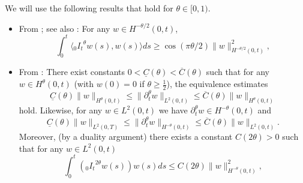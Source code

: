 We will use the following results that hold for $\theta\in[0,1)$.
\begin{itemize}	
	\item
	From \cite[Lemma 2.3]{Eggermont:1987}; see also \cite[Theorem 1]{VoegeliNedaiaslSauter:2016}: For any $w\in H^{-\theta/2}(0,t)$,
	\begin{equation}\label{eqn:coercivityI}
	\int_0^t \langle {_0I_t}^{\theta} w(s),  w(s) \rangle ds \geq \cos ( \pi\theta/2 ) \| w \|_{H^{-\theta/2}(0,t)}^2, 
	\end{equation}	 
	\item 
	From \cite[Theorems 2.1, 2.2, 2.4 and Proposition 2.1]{KubicaRyszewskaYamamoto:2020}:
	There exist constants $0<\underline{C}(\theta)<\overline{C}(\theta)$ such that for any $w\in H^\theta(0,t)$ (with $w(0)=0$ if $\theta\geq\frac12$), the equivalence estimates 
	\begin{equation}\label{eqn:equivalence_pos}
\underline{C}(\theta) \|w\|_{H^\theta(0,t)} \leq \|\partial_t^\theta w\|_{L^2(0,t)}\leq
\overline{C}(\theta) \|w\|_{H^\theta(0,t)}
	\end{equation}
hold.
Likewise, for any $w\in L^2(0,t)$ we have $\partial_t^\theta w\in H^{-\theta}(0,t)$ and 
	\begin{equation}\label{eqn:equivalence_neg}
\underline{C}(\theta) \|w\|_{L^2(0,T)} \leq \|\partial_t^\theta w\|_{H^{-\theta}(0,t)}\leq
\overline{C}(\theta) \|w\|_{L^2(0,t)}.
	\end{equation}
Moreover, (by a duality argument) there exists a constant $C(2\theta)>0$ such that for any $w\in L^2(0,t)$
	\begin{equation}\label{eqn:boundednessI}
	\int_0^t ({_0I_t}^{2\theta} w(s))  w(s) ds \leq C(2\theta)\| w \|_{H^{-\theta}(0,t)}^2, 
	\end{equation}	 
\end{itemize}


